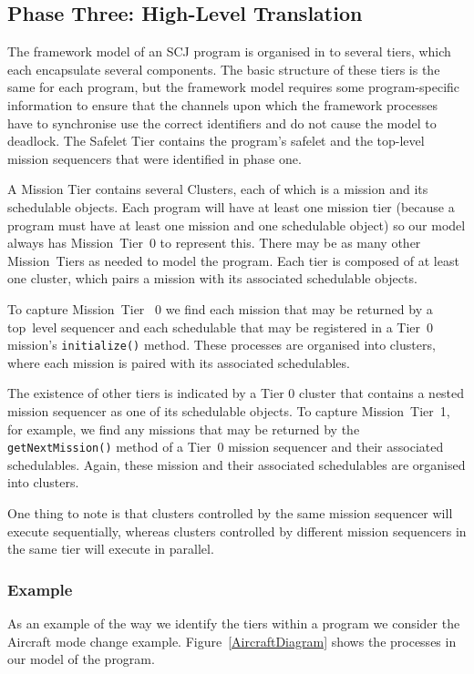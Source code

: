 \documentclass[10pt,a4paper]{article}
\begin{document}
\subsection{Phase Three: High-Level Translation}

The framework model of an SCJ program is organised in to several tiers, which each encapsulate several components. The basic structure of these tiers is the same for each program, but the framework model requires some program-specific information to ensure that the channels upon which the framework processes have to synchronise use the correct identifiers and do not cause the model to deadlock. The Safelet Tier contains the program's safelet and the top-level mission sequencers that were identified in phase one.

A Mission Tier contains several Clusters, each of which is a mission and its schedulable objects. Each program will have at least one mission tier (because a program must have at least one mission and one schedulable object) so our model always has Mission~Tier~0 to represent this. There may be as many other Mission~Tiers as needed to model the program. Each tier is composed of at least one cluster, which pairs a mission with its associated schedulable objects.

To capture Mission~Tier~ 0 we find each mission that may be returned by a top~level sequencer and each schedulable that may be registered in a Tier~0 mission's \texttt{initialize()} method. These processes are organised into clusters, where each mission is paired with its associated schedulables. 

The existence of other tiers is indicated by a Tier 0 cluster that contains a nested mission sequencer as one of its schedulable objects. To capture Mission~Tier~1, for example, we find any missions that may be returned by the \texttt{getNextMission()} method of a Tier~0 mission sequencer and their associated schedulables. Again, these mission and their associated schedulables are organised into clusters.  

One thing to note is that clusters controlled by the same mission sequencer will execute sequentially, whereas clusters controlled by different mission sequencers in the same tier will execute in parallel. 

\subsubsection{Example}

As an example of the way we identify the tiers within a program we consider the Aircraft mode change example. Figure~\ref{AircraftDiagram} shows the processes in our model of the program. 
\end{document}
